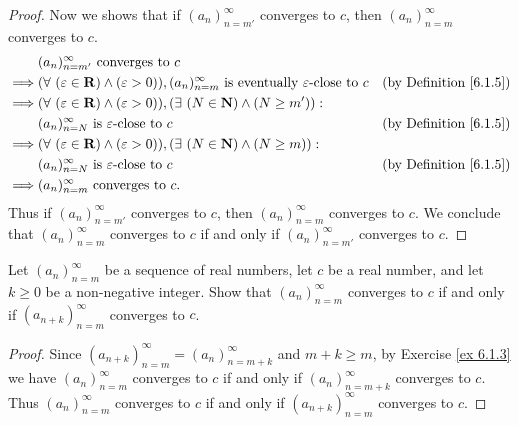 \begin{proof}
    Now we shows that if \((a_n)_{n = m'}^\infty\) converges to \(c\), then \((a_n)_{n = m}^\infty\) converges to \(c\).
    \begin{align*}
                 & (a_n)_{n = m'}^\infty \text{ converges to } c                                                                                                                                    \\
        \implies & (\forall\ (\varepsilon \in \mathbf{R}) \land (\varepsilon > 0)), (a_n)_{n = m}^\infty \text{ is eventually } \varepsilon\text{-close to } c & \text{(by Definition \ref{6.1.5})} \\
        \implies & (\forall\ (\varepsilon \in \mathbf{R}) \land (\varepsilon > 0)), (\exists\ (N \in \mathbf{N}) \land (N \geq m')) :                                                               \\
                 & (a_n)_{n = N}^\infty \text{ is } \varepsilon\text{-close to } c                                                                             & \text{(by Definition \ref{6.1.5})} \\
        \implies & (\forall\ (\varepsilon \in \mathbf{R}) \land (\varepsilon > 0)), (\exists\ (N \in \mathbf{N}) \land (N \geq m)) :                                                                \\
                 & (a_n)_{n = N}^\infty \text{ is } \varepsilon\text{-close to } c                                                                             & \text{(by Definition \ref{6.1.5})} \\
        \implies & (a_n)_{n = m}^\infty \text{ converges to } c.
    \end{align*}
    Thus if \((a_n)_{n = m'}^\infty\) converges to \(c\), then \((a_n)_{n = m}^\infty\) converges to \(c\).
    We conclude that \((a_n)_{n = m}^\infty\) converges to \(c\) if and only if \((a_n)_{n = m'}^\infty\) converges to \(c\).
\end{proof}

\begin{exercise}\label{ex 6.1.4}
    Let \((a_n)_{n = m}^\infty\) be a sequence of real numbers, let \(c\) be a real number, and let \(k \geq 0\) be a non-negative integer.
    Show that \((a_n)_{n = m}^\infty\) converges to \(c\) if and only if \((a_{n + k})_{n = m}^\infty\) converges to \(c\).
\end{exercise}

\begin{proof}
    Since \((a_{n + k})_{n = m}^\infty = (a_n)_{n = m + k}^\infty\) and \(m + k \geq m\), by Exercise \ref{ex 6.1.3} we have \((a_n)_{n = m}^\infty\) converges to \(c\) if and only if \((a_n)_{n = m + k}^\infty\) converges to \(c\).
    Thus \((a_n)_{n = m}^\infty\) converges to \(c\) if and only if \((a_{n + k})_{n = m}^\infty\) converges to \(c\).
\end{proof}

